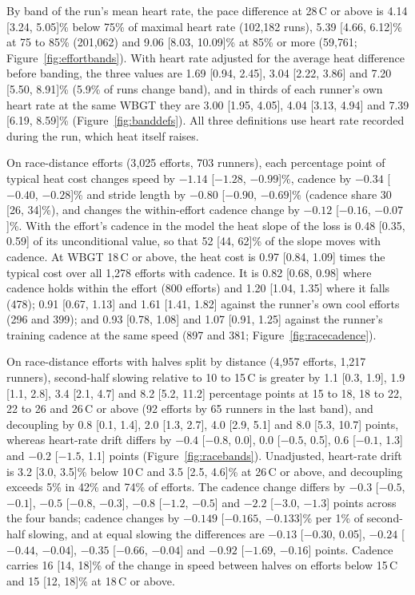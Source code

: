 \documentclass[11pt]{article}
\renewcommand{\_}{\textunderscore\allowbreak}
\begin{document}
By band of the run's mean heart rate, the pace difference at 28\,\textdegree C or above is 4.14 [3.24, 5.05]\% below 75\% of maximal heart rate (102{,}182 runs), 5.39 [4.66, 6.12]\% at 75 to 85\% (201{,}062) and 9.06 [8.03, 10.09]\% at 85\% or more (59{,}761; Figure~\ref{fig:effortbands}). With heart rate adjusted for the average heat difference before banding, the three values are 1.69 [0.94, 2.45], 3.04 [2.22, 3.86] and 7.20 [5.50, 8.91]\% (5.9\% of runs change band), and in thirds of each runner's own heart rate at the same WBGT they are 3.00 [1.95, 4.05], 4.04 [3.13, 4.94] and 7.39 [6.19, 8.59]\% (Figure~\ref{fig:banddefs}). All three definitions use heart rate recorded during the run, which heat itself raises.

On race-distance efforts (3{,}025 efforts, 703 runners), each percentage point of typical heat cost changes speed by $-1.14$ [$-1.28$, $-0.99$]\%, cadence by $-0.34$ [$-0.40$, $-0.28$]\% and stride length by $-0.80$ [$-0.90$, $-0.69$]\% (cadence share 30 [26, 34]\%), and changes the within-effort cadence change by $-0.12$ [$-0.16$, $-0.07$]\%. With the effort's cadence in the model the heat slope of the loss is 0.48 [0.35, 0.59] of its unconditional value, so that 52 [44, 62]\% of the slope moves with cadence. At WBGT 18\,\textdegree C or above, the heat cost is 0.97 [0.84, 1.09] times the typical cost over all 1{,}278 efforts with cadence. It is 0.82 [0.68, 0.98] where cadence holds within the effort (800 efforts) and 1.20 [1.04, 1.35] where it falls (478); 0.91 [0.67, 1.13] and 1.61 [1.41, 1.82] against the runner's own cool efforts (296 and 399); and 0.93 [0.78, 1.08] and 1.07 [0.91, 1.25] against the runner's training cadence at the same speed (897 and 381; Figure~\ref{fig:racecadence}).

On race-distance efforts with halves split by distance (4{,}957 efforts, 1{,}217 runners), second-half slowing relative to 10 to 15\,\textdegree C is greater by 1.1 [0.3, 1.9], 1.9 [1.1, 2.8], 3.4 [2.1, 4.7] and 8.2 [5.2, 11.2] percentage points at 15 to 18, 18 to 22, 22 to 26 and 26\,\textdegree C or above (92 efforts by 65 runners in the last band), and decoupling by 0.8 [0.1, 1.4], 2.0 [1.3, 2.7], 4.0 [2.9, 5.1] and 8.0 [5.3, 10.7] points, whereas heart-rate drift differs by $-0.4$ [$-0.8$, 0.0], 0.0 [$-0.5$, 0.5], 0.6 [$-0.1$, 1.3] and $-0.2$ [$-1.5$, 1.1] points (Figure~\ref{fig:racebands}). Unadjusted, heart-rate drift is 3.2 [3.0, 3.5]\% below 10\,\textdegree C and 3.5 [2.5, 4.6]\% at 26\,\textdegree C or above, and decoupling exceeds 5\% in 42\% and 74\% of efforts. The cadence change differs by $-0.3$ [$-0.5$, $-0.1$], $-0.5$ [$-0.8$, $-0.3$], $-0.8$ [$-1.2$, $-0.5$] and $-2.2$ [$-3.0$, $-1.3$] points across the four bands; cadence changes by $-0.149$ [$-0.165$, $-0.133$]\% per 1\% of second-half slowing, and at equal slowing the differences are $-0.13$ [$-0.30$, 0.05], $-0.24$ [$-0.44$, $-0.04$], $-0.35$ [$-0.66$, $-0.04$] and $-0.92$ [$-1.69$, $-0.16$] points. Cadence carries 16 [14, 18]\% of the change in speed between halves on efforts below 15\,\textdegree C and 15 [12, 18]\% at 18\,\textdegree C or above.
\end{document}
